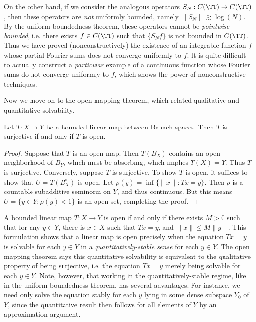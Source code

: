 On the other hand, if we consider the analogous operators $S_N: C(\TT) \to C(\TT)$, then these operators are \emph{not} uniformly bounded, namely $\| S_N \| \gtrsim \log(N)$. By the uniform boundedness theorem, these operators cannot be \emph{pointwise bounded}, i.e. there exists $f \in C(\TT)$ such that $\{ S_N f \}$ is not bounded in $C(\TT)$. Thus we have proved (nonconstructively) the existence of an integrable function $f$ whose partial Fourier sums does not converge uniformly to $f$. It is quite difficult to actually construct a \emph{particular} example of a continuous function whose Fourier sums do not converge uniformly to $f$, which shows the power of nonconstructive techniques.

Now we move on to the open mapping theorem, which related qualitative and quantitative solvability.

\begin{theorem}
    Let $T: X \to Y$ be a bounded linear map between Banach spaces. Then $T$ is surjective if and only if $T$ is open.
\end{theorem}
\begin{proof}
    Suppose that $T$ is an open map. Then $T(B_X)$ contains an open neighborhood of $B_Y$, which must be absorbing, which implies $T(X) = Y$. Thus $T$ is surjective. Conversely, suppose $T$ is surjective. To show $T$ is open, it suffices to show that $U = T(B_X^\circ)$ is open. Let $\rho(y) = \inf \{ \| x \| : Tx = y \}$. Then $\rho$ is a countable subadditive seminorm on $Y$, and thus continuous. But this means $U = \{ y \in Y: \rho(y) < 1 \}$ is an open set, completing the proof.
\end{proof}

A bounded linear map $T: X \to Y$ is open if and only if there exists $M > 0$ such that for any $y \in Y$, there is $x \in X$ such that $Tx = y$, and $\| x \| \leq M \| y \|$. This formulation shows that a linear map is open precisely when the equation $Tx = y$ is solvable for each $y \in Y$ in a \emph{quantitatively-stable sense} for each $y \in Y$. The open mapping theorem says this quantitative solvability is equivalent to the qualitative property of being surjective, i.e. the equation $Tx = y$ merely being solvable for each $y \in Y$. Note, however, that working in the quantitatively-stable regime, like in the uniform boundedness theorem, has several advantages. For instance, we need only solve the equation stably for each $y$ lying in some dense subspace $Y_0$ of $Y$, since the quantitative result then follows for all elements of $Y$ by an approximation argument.

